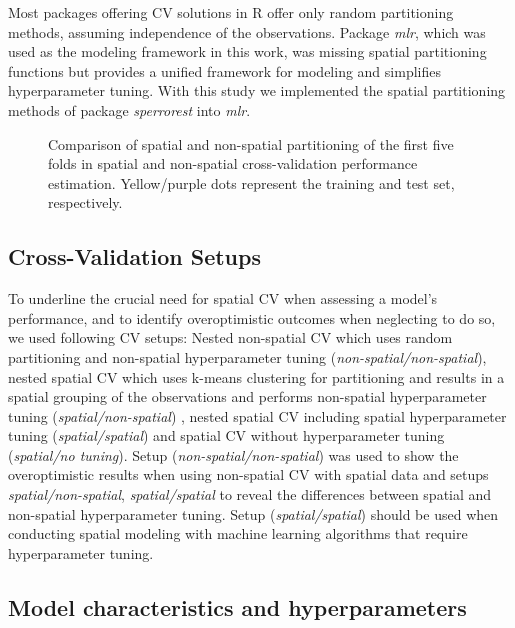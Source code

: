 \documentclass[review]{elsarticle}
\begin{document}
Most packages offering \ac{CV} solutions in R offer only random partitioning methods, assuming independence of the observations.
Package \textit{mlr}, which was used as the modeling framework in this work, was missing spatial partitioning functions but provides a unified framework for modeling and simplifies hyperparameter tuning.
With this study we implemented the spatial partitioning methods of package \textit{sperrorest} into \textit{mlr}.

\begin{figure} [t!]
	\begin{center}
		\caption[]{Comparison of spatial and non-spatial partitioning of the first five folds in spatial and non-spatial cross-validation performance estimation.
			Yellow/purple dots represent the training and test set, respectively.}
		\label{fig:cv_settings_comparison}
	\end{center}
\end{figure}

\subsection{Cross-Validation Setups}

To underline the crucial need for spatial \ac{CV} when assessing a model's performance, and to identify overoptimistic outcomes when neglecting to do so, we used following CV setups:
Nested non-spatial \ac{CV} which uses random partitioning and non-spatial hyperparameter tuning (\emph{non-spatial/non-spatial}),
nested spatial \ac{CV} which uses k-means clustering for partitioning \citep{Brenning2005} and results in a spatial grouping of the observations and performs non-spatial hyperparameter tuning (\emph{spatial/non-spatial}) ,
nested spatial \ac{CV} including spatial hyperparameter tuning (\emph{spatial/spatial}) and
spatial \ac{CV} without hyperparameter tuning (\emph{spatial/no tuning}).
Setup (\emph{non-spatial/non-spatial}) was used to show the overoptimistic results when using non-spatial \ac{CV} with spatial data and setups \emph{spatial/non-spatial}, \emph{spatial/spatial} to reveal the differences between spatial and non-spatial hyperparameter tuning.
Setup (\emph{spatial/spatial}) should be used when conducting spatial modeling with machine learning algorithms that require hyperparameter tuning.

\subsection{Model characteristics and hyperparameters}
\label{subsec:mod_chars}
\end{document}
